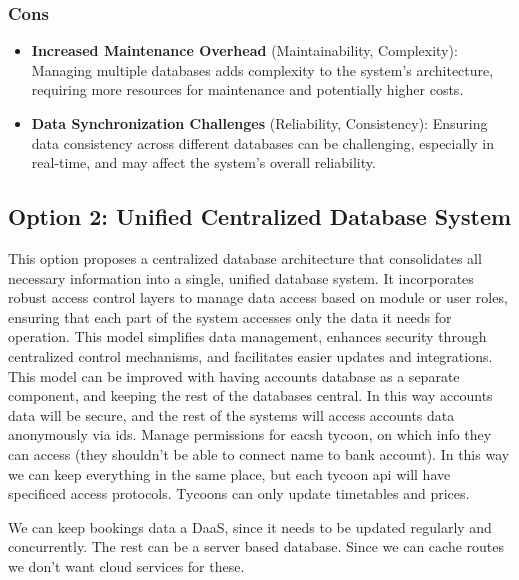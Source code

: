 \subsubsection*{Cons}
\begin{itemize}[noitemsep]
    \item \textbf{Increased Maintenance Overhead} (Maintainability, Complexity): Managing multiple databases adds complexity to the system's architecture, requiring more resources for maintenance and potentially higher costs.
    \item \textbf{Data Synchronization Challenges} (Reliability, Consistency): Ensuring data consistency across different databases can be challenging, especially in real-time, and may affect the system's overall reliability.
\end{itemize}

\subsection*{Option 2: Unified Centralized Database System}

This option proposes a centralized database architecture that consolidates all necessary information into a single, unified database system. It incorporates robust access control layers to manage data access based on module or user roles, ensuring that each part of the system accesses only the data it needs for operation. This model simplifies data management, enhances security through centralized control mechanisms, and facilitates easier updates and integrations. This model can be improved with having accounts database as a separate component, and keeping the rest of the databases central. In this way accounts data will be secure, and the rest of the systems will access accounts data anonymously via ids. Manage permissions for eacsh tycoon, on which info they can access (they shouldn't be able to connect name to bank account). In this way we can keep everything in the same place, but each tycoon api will have specificed access protocols. Tycoons can only update timetables and prices.

We can keep bookings data a DaaS, since it needs to be updated regularly and concurrently. The rest can be a server based database. Since we can cache routes we don't want cloud services for these. 

